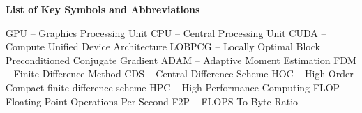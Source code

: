 \noindent
\begingroup
    \fontsize{12pt}{1.5pt}\selectfont
    \textbf{List of Key Symbols and Abbreviations}
\endgroup

\vspace{3mm}

\noindent GPU -- Graphics Processing Unit\newline
CPU -- Central Processing Unit\newline
CUDA -- Compute Unified Device Architecture\newline
LOBPCG -- Locally Optimal Block Preconditioned Conjugate Gradient\newline
ADAM -- Adaptive Moment Estimation\newline
FDM -- Finite Difference Method\newline
CDS -- Central Difference Scheme\newline
HOC -- High-Order Compact finite difference scheme\newline
HPC -- High Performance Computing\newline
FLOP -- Floating-Point Operations Per Second
F2P -- FLOPS To Byte Ratio



